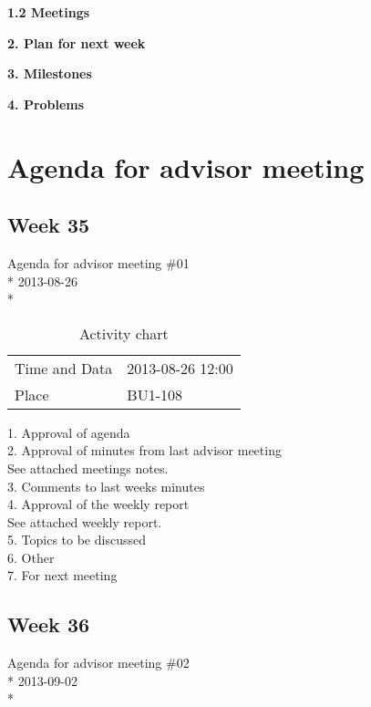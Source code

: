 \textbf{1.2 Meetings}

\textbf{2. Plan for next week}

\textbf{3. Milestones}

\textbf{4. Problems}

\fi


\newpage

\section{Agenda for advisor meeting}
\subsection{Week 35}

\begin{center}
Agenda for advisor meeting \#01\\*
2013-08-26\\*
\end{center}

\begin{table}[H]
\begin{center}
\begin{tabular}{ l | l }
Time and Data & 2013-08-26 12:00 \\
Place & BU1-108 \\
\end{tabular}
\end{center}
\caption{Activity chart}
\label{table:activityChartAdvisorAgendaWeek35}
\end{table}

1. Approval of agenda \\
2. Approval of minutes from last advisor meeting \\
See attached meetings notes. \\
3. Comments to last weeks minutes \\
4. Approval of the weekly report \\
See attached weekly report. \\
5. Topics to be discussed \\
6. Other \\
7. For next meeting \\

\newpage
\subsection{Week 36}

\begin{center}
Agenda for advisor meeting \#02\\*
2013-09-02\\*
\end{center}

